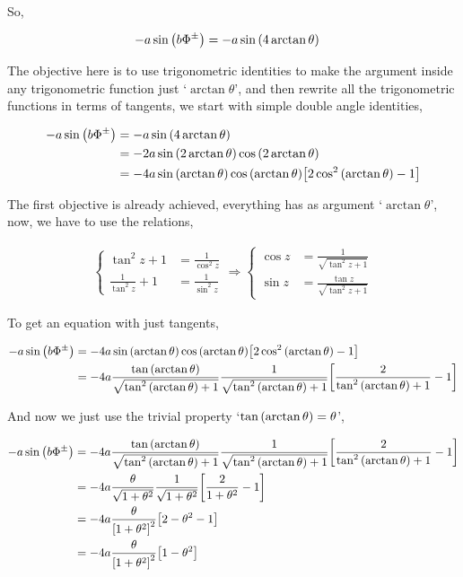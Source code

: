 So,

\begin{align}
    -a\sin\qty(b\Phi^\pm)&=-a\sin\qty(4\arctan\theta)\nonumber
\end{align}

The objective here is to use trigonometric identities to make the argument inside any trigonometric function just 
`$\arctan\theta$', and then rewrite all the trigonometric functions in terms of tangents, we start with simple 
double angle identities,

\begin{align}
    -a\sin\qty(b\Phi^\pm)&=-a\sin\qty(4\arctan\theta)\nonumber\\
    &=-2a\sin\qty(2\arctan\theta)\cos\qty(2\arctan\theta)\nonumber\\
    &=-4a\sin\qty(\arctan\theta)\cos\qty(\arctan\theta)\qty[2\cos^2\qty(\arctan\theta)-1]\nonumber
\end{align}

The first objective is already achieved, everything has as argument `$\arctan\theta$', now, we have to use the 
relations,

\begin{align}
    \begin{cases}
        \tan^2z+1&=\frac{1}{\cos^2z}\\
        \frac{1}{\tan^2z}+1&=\frac{1}{\sin^2z}
    \end{cases}\Rightarrow
    \begin{cases}
        \cos z&=\frac{1}{\sqrt{\tan^2z+1}}\\
        \sin z&=\frac{\tan z}{\sqrt{\tan^2z+1}}
    \end{cases}\nonumber
\end{align}

To get an equation with just tangents,

\begin{align}
    -a\sin\qty(b\Phi^\pm)&=-4a\sin\qty(\arctan\theta)\cos\qty(\arctan\theta)
    \qty[2\cos^2\qty(\arctan\theta)-1]\nonumber\\
    &=-4a\frac{\tan\qty(\arctan\theta)}
        {\sqrt{\tan^2\qty(\arctan\theta)+1}}
    \frac{1}{\sqrt{\tan^2\qty(\arctan\theta)+1}}\qty[\frac{2}{\tan^2\qty(\arctan\theta)+1}-1]\nonumber
\end{align}

And now we just use the trivial property `$\tan\qty(\arctan\theta)=\theta$',

\begin{align}
    -a\sin\qty(b\Phi^\pm)&=-4a\frac{\tan\qty(\arctan\theta)}
        {\sqrt{\tan^2\qty(\arctan\theta)+1}}
    \frac{1}{\sqrt{\tan^2\qty(\arctan\theta)+1}}\qty[\frac{2}{\tan^2\qty(\arctan\theta)+1}-1]\nonumber\\
    &=-4a\frac{\theta}{\sqrt{1+\theta^2}}
    \frac{1}{\sqrt{1+\theta^2}}\qty[\frac{2}{1+\theta^2}-1]\nonumber\\
    &=-4a\frac{\theta}{\qty[1+\theta^2]^2}\qty[2-\theta^2-1]\nonumber\\
    &=-4a\frac{\theta}{\qty[1+\theta^2]^2}\qty[1-\theta^2]\nonumber
\end{align}

